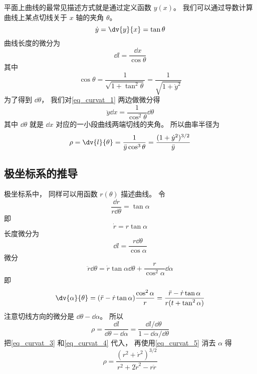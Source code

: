 平面上曲线的最常见描述方式就是通过定义函数 $y(x)$。 我们可以通过导数计算曲线上某点切线关于 $x$ 轴的夹角 $\theta$。
\begin{equation}\label{eq_curvat_1}
\dot y = \dv{y}{x} = \tan \theta
\end{equation}
曲线长度的微分为
\begin{equation}
\dd{l} = \frac{\dd{x}}{\cos\theta}
\end{equation}
其中
\begin{equation}\label{eq_curvat_2}
\cos\theta = \frac{1}{\sqrt{1 + \tan^2\theta}} = \frac{1}{\sqrt{1 + \dot y^2}}
\end{equation}
为了得到 $\dd{\theta}$， 我们对\autoref{eq_curvat_1} 两边做微分得
\begin{equation}
\ddot y \dd{x} = \frac{1}{\cos^2\theta} \dd{\theta}
\end{equation}
其中 $\dd{\theta}$ 就是 $\dd{x}$ 对应的一小段曲线两端切线的夹角。 所以曲率半径为
\begin{equation}
\rho = \dv{l}{\theta} = \frac{1}{\ddot y\cos^3\theta} = \frac{(1 + \dot y^2)^{3/2}}{\ddot y}
\end{equation}

\subsection{极坐标系的推导}
极坐标系中， 同样可以用函数 $r(\theta)$ 描述曲线。
令
\begin{equation}
\frac{\dd{r}}{r \dd{\theta}} = \tan\alpha
\end{equation}
即
\begin{equation}\label{eq_curvat_5}
\dot r = r\tan\alpha
\end{equation}
长度微分为
\begin{equation}
\dd{l} = \frac{r\dd{\theta}}{\cos\alpha}
\end{equation}
微分
\begin{equation}
\ddot r\dd{\theta} = \dot r\tan\alpha\dd{\theta} + \frac{r}{\cos^2\alpha}\dd{\alpha}
\end{equation}
即
\begin{equation}\label{eq_curvat_4}
\dv{\alpha}{\theta} = (\ddot r - \dot r \tan\alpha) \frac{\cos^2\alpha}{r} = \frac{\ddot r - \dot r\tan\alpha}{r(t + \tan^2\alpha)}
\end{equation}
注意切线方向的微分是 $\dd{\theta} - \dd{\alpha}$。 所以
\begin{equation}
\rho = \frac{\dd{l}}{\dd{\theta} - \dd{\alpha}} = \frac{\dd{l}/\dd{\theta}}{1 - \dd{\alpha}/\dd{\theta}}
\end{equation}
把\autoref{eq_curvat_3} 和\autoref{eq_curvat_4} 代入， 再使用\autoref{eq_curvat_5} 消去 $\alpha$ 得
\begin{equation}
\rho = \frac{(r^2 + \dot r^2)^{3/2}}{r^2 + 2\dot r^2 - r\ddot r}
\end{equation}
